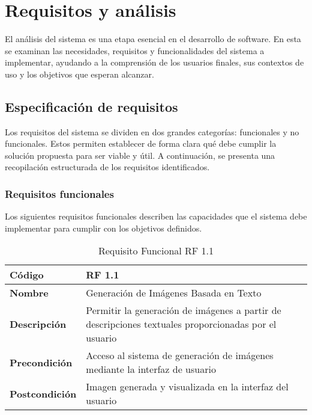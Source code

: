 \section{Requisitos y análisis}
El análisis del sistema es una etapa esencial en el desarrollo de software. En esta se examinan las necesidades, requisitos y funcionalidades del sistema a implementar, ayudando a la comprensión de los usuarios finales, sus contextos de uso y los objetivos que esperan alcanzar.

\subsection{Especificación de requisitos}
Los requisitos del sistema se dividen en dos grandes categorías: funcionales y no funcionales. Estos permiten establecer de forma clara qué debe cumplir la solución propuesta para ser viable y útil. A continuación, se presenta una recopilación estructurada de los requisitos identificados.

\subsubsection{Requisitos funcionales}
Los siguientes requisitos funcionales describen las capacidades que el sistema debe implementar para cumplir con los objetivos definidos.

\begin{table}[H]
    \centering 
    \renewcommand{\arraystretch}{1.5} 
    \begin{tabular}{|l|p{12cm}|} 
        \hline 
        \rowcolor{gray!30} 
        \textbf{Código} & \textbf{RF 1.1} \\
        \hline
        \textbf{Nombre} & Generación de Imágenes Basada en Texto \\
        \hline 
        \textbf{Descripción} & Permitir la generación de imágenes a partir de descripciones textuales proporcionadas por el usuario \\
        \hline 
        \textbf{Precondición} & Acceso al sistema de generación de imágenes mediante la interfaz de usuario \\
        \hline 
        \textbf{Postcondición} & Imagen generada y visualizada en la interfaz del usuario \\
        \hline 
    \end{tabular}
    \caption{Requisito Funcional RF 1.1} 
    \label{tab:reqfun1}
\end{table}

